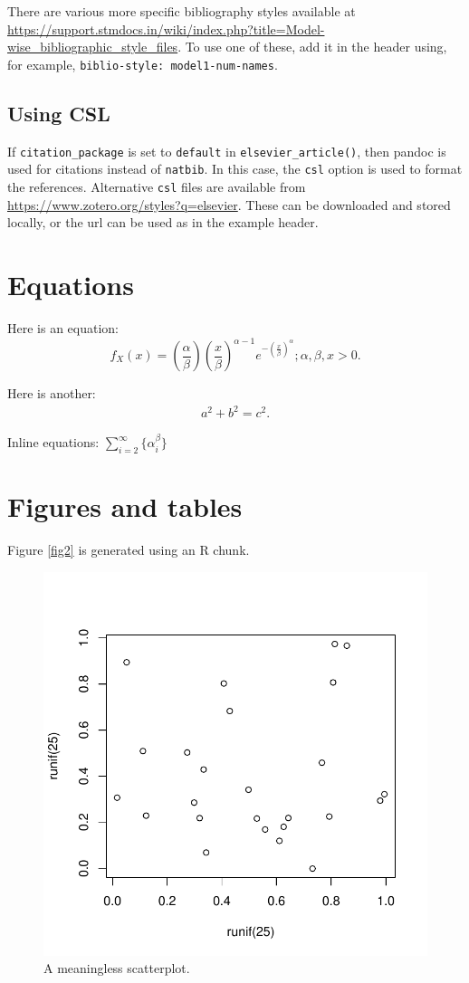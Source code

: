 \documentclass[preprint, 3p,
authoryear]{elsarticle} %
\begin{document}
There are various more specific bibliography styles available at
\url{https://support.stmdocs.in/wiki/index.php?title=Model-wise_bibliographic_style_files}.
To use one of these, add it in the header using, for example,
\texttt{biblio-style:\ model1-num-names}.

\subsection{Using CSL}\label{using-csl}

If \texttt{citation\_package} is set to \texttt{default} in
\texttt{elsevier\_article()}, then pandoc is used for citations instead
of \texttt{natbib}. In this case, the \texttt{csl} option is used to
format the references. Alternative \texttt{csl} files are available from
\url{https://www.zotero.org/styles?q=elsevier}. These can be downloaded
and stored locally, or the url can be used as in the example header.

\section{Equations}\label{equations}

Here is an equation: \[ 
  f_{X}(x) = \left(\frac{\alpha}{\beta}\right)
  \left(\frac{x}{\beta}\right)^{\alpha-1}
  e^{-\left(\frac{x}{\beta}\right)^{\alpha}}; 
  \alpha,\beta,x > 0 .
\]

Here is another: \begin{align}
  a^2+b^2=c^2.
\end{align}

Inline equations: \(\sum_{i = 2}^\infty\{\alpha_i^\beta\}\)

\section{Figures and tables}\label{figures-and-tables}

Figure \ref{fig2} is generated using an R chunk.

\begin{figure}

{\centering \includegraphics[width=0.5\linewidth]{grocery_store_hamilton_files/figure-latex/fig2-1} 

}

\caption{\label{fig2}A meaningless scatterplot.}\label{fig:fig2}
\end{figure}
\end{document}
